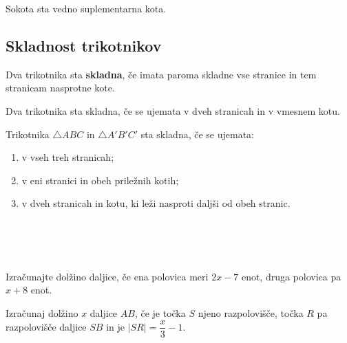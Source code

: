     
        Sokota sta vedno suplementarna kota.
    




    \subsection*{Skladnost trikotnikov}


    \begin{definicija}
        Dva trikotnika sta \textbf{skladna}, če imata paroma skladne vse stranice in tem stranicam nasprotne kote.
    \end{definicija}

    \begin{aksiom}
        Dva trikotnika sta skladna, če se ujemata v dveh stranicah in v vmesnem kotu.
    \end{aksiom}

    \begin{izrek}
        Trikotnika $\triangle ABC$ in $\triangle A'B'C'$ sta skladna, če se ujemata:
        \begin{enumerate}
            \item v vseh treh stranicah;
            \item v eni stranici in obeh priležnih kotih;
            \item v dveh stranicah in kotu, ki leži nasproti daljši od obeh stranic.
        \end{enumerate}
    \end{izrek}






~\\~~\\~\\


    \begin{naloga}
        Izračunajte dolžino daljice, če ena polovica meri $2x-7$ enot, druga polovica pa $x+8$ enot.
    \end{naloga}

    \begin{naloga}
        Izračunaj dolžino $x$ daljice $AB$, če je točka $S$ njeno razpolovišče, točka $R$ pa razpolovišče daljice $SB$ in je $\lvert SR \rvert = \dfrac{x}{3}-1$.
    \end{naloga}

